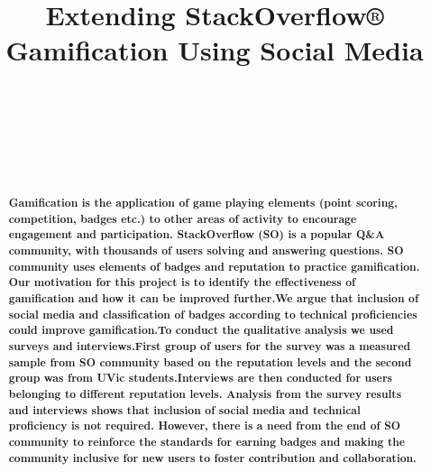 \documentclass{sigchi}
\begin{document}
\title{Extending StackOverflow® Gamification Using Social Media}

\author{%
    \\
    \\
    \\
    \\
    \\
}

\maketitle

\begin{abstract}
\textbf{Gamification is the application of game playing elements (point scoring, competition, badges etc.) to other areas of activity to encourage engagement and participation. StackOverflow (SO) is a popular Q\&A community, with thousands of users solving and answering questions. SO community uses elements of badges and reputation to practice gamification.  Our motivation for this project is to identify the effectiveness of gamification and how it can be improved further.We argue that inclusion of social media and classification of badges according to technical proficiencies could improve gamification.To conduct the qualitative analysis we used surveys and interviews.First group of users for the survey was a measured sample from SO community based on the reputation levels and the second group was from UVic students.Interviews are then conducted for users belonging to different reputation levels. Analysis from the survey results and interviews shows that inclusion of social media and technical proficiency is not required. However, there is a need from the end of SO community to reinforce the standards for earning badges and making the community inclusive for new users to foster contribution and collaboration.}
\end{abstract}
\end{document}
